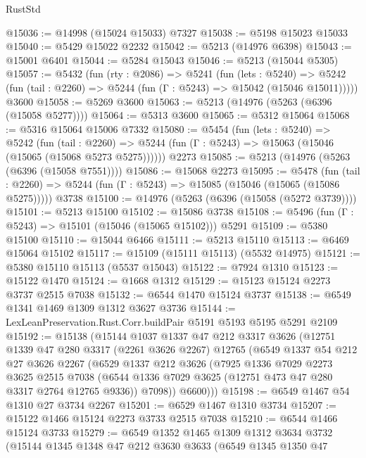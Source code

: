 \begin{lexlean}{RustStd}
\begin{coremodule}
@15036 := @14998 (@15024 @15033) @7327
@15038 := @5198 @15023 @15033
@15040 := @5429 @15022 @2232
@15042 := @5213 (@14976 @6398)
@15043 := @15001 @6401
@15044 := @5284 @15043
@15046 := @5213 (@15044 @5305)
@15057 := @5432
    (fun (rty : @2086) =>
    @5241
      (fun (lets : @5240) =>
      @5242 (fun (tail : @2260) => @5244 (fun (Γ : @5243) => @15042 (@15046 @15011)))))
    @3600
@15058 := @5269 @3600
@15063 := @5213 (@14976 (@5263 (@6396 (@15058 @5277))))
@15064 := @5313 @3600
@15065 := @5312 @15064
@15068 := @5316 @15064 @15006 @7332
@15080 := @5454
    (fun (lets : @5240) =>
    @5242
      (fun (tail : @2260) =>
      @5244 (fun (Γ : @5243) => @15063 (@15046 (@15065 (@15068 @5273 @5275))))))
    @2273
@15085 := @5213 (@14976 (@5263 (@6396 (@15058 @7551))))
@15086 := @15068 @2273
@15095 := @5478
    (fun (tail : @2260) => @5244 (fun (Γ : @5243) => @15085 (@15046 (@15065 (@15086 @5275)))))
    @3738
@15100 := @14976 (@5263 (@6396 (@15058 (@5272 @3739))))
@15101 := @5213 @15100
@15102 := @15086 @3738
@15108 := @5496 (fun (Γ : @5243) => @15101 (@15046 (@15065 @15102))) @5291
@15109 := @5380 @15100
@15110 := @15044 @6466
@15111 := @5213 @15110
@15113 := @6469 @15064 @15102
@15117 := @15109 (@15111 @15113) (@5532 @14975)
@15121 := @5380 @15110 @15113 (@5537 @15043)
@15122 := @7924 @1310
@15123 := @15122 @1470
@15124 := @1668 @1312
@15129 := @15123 @15124 @2273 @3737 @2515 @7038
@15132 := @6544 @1470 @15124 @3737
@15138 := @6549 @1341 @1469 @1309 @1312 @3627 @3736
@15144 := LexLeanPreservation.Rust.Corr.buildPair @5191 @5193 @5195 @5291 @2109
@15192 := @15138
    (@15144
      @1037
      @1337
      @47
      @212
      @3317
      @3626
      (@12751
        @1339
        @47
        @280
        @3317
        (@2261 @3626 @2267)
        @12765
        (@6549
          @1337
          @54
          @212
          @27
          @3626
          @2267
          (@6529
            @1337
            @212
            @3626
            (@7925
              @1336
              @7029
              @2273
              @3625
              @2515
              @7038
              (@6544 @1336 @7029 @3625 (@12751 @473 @47 @280 @3317 @2764 @12765 @9336))
              @7098))
          @6600)))
@15198 := @6549 @1467 @54 @1310 @27 @3734 @2267
@15201 := @6529 @1467 @1310 @3734
@15207 := @15122 @1466 @15124 @2273 @3733 @2515 @7038
@15210 := @6544 @1466 @15124 @3733
@15279 := @6549
    @1352
    @1465
    @1309
    @1312
    @3634
    @3732
    (@15144
      @1345
      @1348
      @47
      @212
      @3630
      @3633
      (@6549
        @1345
        @1350
        @47

\end{coremodule}
\end{lexlean}
